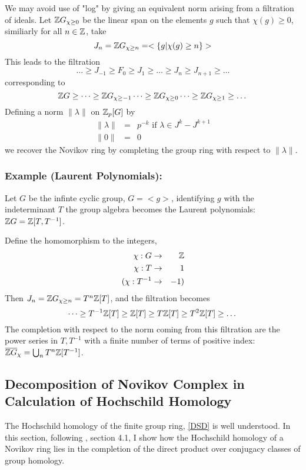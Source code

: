 We may avoid use of "log" by giving an equivalent norm arising from a filtration of ideals. Let $\mathbb Z G_{\chi\geq 0}$ be the linear span on the elements $g$ such that $\chi (g)\geq 0$, similiarly for all $n\in\mathbb Z$, take
$$J_{n} = \mathbb Z G_{\chi\geq n} = <\{g|\chi(g)\geq n\}>$$ This leads to the filtration 
$$\dots\geq J_{-1}\geq F_{0}\geq J_1\geq \dots\geq J_n\geq J_{n+1}\geq \dots$$
corresponding to 
$$\mathbb Z G\geq \dots \geq{\mathbb ZG}_{\chi\geq -1} \dots \geq{\mathbb ZG}_{\chi\geq 0} \dots \geq{\mathbb ZG}_{\chi\geq 1} \geq\dots$$
Defining a norm $\parallel \lambda \parallel$ on $\mathbb Z_p[G]$ by
\begin{eqnarray}
\nonumber \parallel \lambda\parallel &=& p^{-k} \text{    if }\lambda \in J^k-J^{k+1}\\
\nonumber \parallel 0\parallel &=& 0
\end{eqnarray}
we recover the Novikov ring by completing the group ring with respect to $\parallel \lambda\parallel$.

\subsubsection{Example (Laurent Polynomials):}
Let $G$ be the infinte cyclic group, $G = <g>$, identifying $g$ with the indeterminant $T$ the group algebra becomes the Laurent polynomials: $\mathbb Z G = \mathbb Z[T,T^{-1}]$.

Define the homomorphism to the integers,
\begin{eqnarray}
\nonumber \chi: G &\rightarrow& \mathbb Z\\
\nonumber       \chi:  T &\rightarrow& 1\\
\nonumber   ( \chi:T^{-1} &\rightarrow& -1)
\end{eqnarray}
Then $J_n = \mathbb Z G_{\chi\geq n} = T^n \mathbb Z [T]$, and the filtration becomes 
$$\dots\geq T^{-1} \mathbb Z [T] \geq  \mathbb Z [T] \geq  T\mathbb Z [T] \geq T^{2} \mathbb Z [T] \geq \dots$$
The completion with respect to  the norm coming from this filtration are the power series in $T,T^{-1}$ with a finite number of terms of positive index: $\overline{\mathbb Z G}_\chi = \bigcup_n  T^n\mathbb Z [T^{-1}]$.
\subsection{Decomposition of Novikov Complex in Calculation of Hochschild Homology}
The Hochschild homology of the finite group ring, \ref{DSD} is well understood. In this section, following \cite{S}, section 4.1, I show how the Hochschild homology of a Novikov ring lies in the completion of the direct product over conjugacy classes of group homology.

